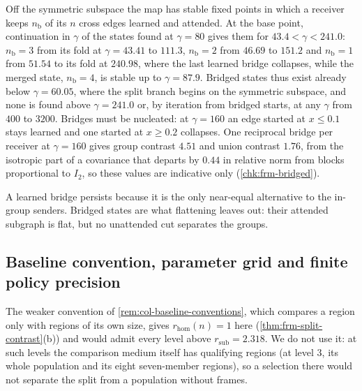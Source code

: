 \begin{observation}\label{obs:frm-bridged}
Off the symmetric subspace the map has stable fixed points in which a receiver keeps $n_{\mathrm b}$ of its $n$ cross edges learned and attended. At the base point, continuation in $\gamma$ of the states found at $\gamma=80$ gives them for $43.4<\gamma<241.0$: $n_{\mathrm b}=3$ from its fold at $\gamma=43.41$ to $111.3$, $n_{\mathrm b}=2$ from $46.69$ to $151.2$ and $n_{\mathrm b}=1$ from $51.54$ to its fold at $240.98$, where the last learned bridge collapses, while the merged state, $n_{\mathrm b}=4$, is stable up to $\gamma=87.9$. Bridged states thus exist already below $\gamma=60.05$, where the split branch begins on the symmetric subspace, and none is found above $\gamma=241.0$ or, by iteration from bridged starts, at any $\gamma$ from $400$ to $3200$. Bridges must be nucleated: at $\gamma=160$ an edge started at $x\le0.1$ stays learned and one started at $x\ge0.2$ collapses. One reciprocal bridge per receiver at $\gamma=160$ gives group contrast $4.51$ and union contrast $1.76$, from the isotropic part of a covariance that departs by $0.44$ in relative norm from blocks proportional to $I_2$, so these values are indicative only (\cref{chk:frm-bridged}).
\end{observation}
A learned bridge persists because it is the only near-equal alternative to the in-group senders. Bridged states are what flattening leaves out: their attended subgraph is flat, but no unattended cut separates the groups.

\subsection{Baseline convention, parameter grid and finite policy precision}\label{sup:frm-baseline-convention-parameter-grid-and-f}

\begin{remark}\label{rem:frm-matched-baseline}
The weaker convention of \cref{rem:col-baseline-conventions}, which compares a region only with regions of its own size, gives $r_{\mathrm{hom}}(n)=1$ here (\cref{thm:frm-split-contrast}(b)) and would admit every level above $r_{\mathrm{sub}}=2.318$. We do not use it: at such levels the comparison medium itself has qualifying regions (at level $3$, its whole population and its eight seven-member regions), so a selection there would not separate the split from a population without frames.
\end{remark}

